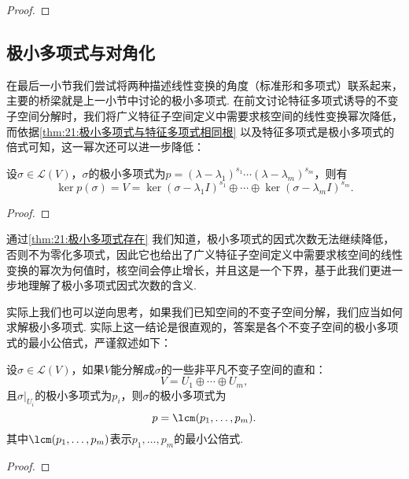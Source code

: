\begin{proof}

\end{proof}

\subsection{极小多项式与对角化}

在最后一小节我们尝试将两种描述线性变换的角度（标准形和多项式）联系起来，主要的桥梁就是上一小节中讨论的极小多项式. 在前文讨论特征多项式诱导的不变子空间分解时，我们将广义特征子空间定义中需要求核空间的线性变换幂次降低，而依据\autoref{thm:21:极小多项式与特征多项式相同根} 以及特征多项式是极小多项式的倍式可知，这一幂次还可以进一步降低：
\begin{theorem} \label{thm:21:极小多项式与分解}
    设$\sigma\in \mathcal{L}(V)$，$\sigma$的极小多项式为$p=(\lambda-\lambda_1)^{s_1}\cdots(\lambda-\lambda_m)^{s_m}$，则有
    \[\ker p(\sigma)=V=\ker (\sigma-\lambda_1I)^{s_1}\oplus\cdots\oplus\ker (\sigma-\lambda_mI)^{s_m}.\]
\end{theorem}

\begin{proof}

\end{proof}

通过\autoref{thm:21:极小多项式存在} 我们知道，极小多项式的因式次数无法继续降低，否则不为零化多项式，因此它也给出了广义特征子空间定义中需要求核空间的线性变换的幂次为何值时，核空间会停止增长，并且这是一个下界，基于此我们更进一步地理解了极小多项式因式次数的含义.

实际上我们也可以逆向思考，如果我们已知空间的不变子空间分解，我们应当如何求解极小多项式. 实际上这一结论是很直观的，答案是各个不变子空间的极小多项式的最小公倍式，严谨叙述如下：
\begin{theorem}
    设$\sigma\in\mathcal{L}(V)$，如果$V$能分解成$\sigma$的一些非平凡不变子空间的直和：
    \[V=U_1\oplus\cdots\oplus U_m,\]
    且$\sigma\vert_{U_i}$的极小多项式为$p_i$，则$\sigma$的极小多项式为
    \[p=\lcm(p_1,\ldots,p_m).\]
    其中$\lcm(p_1,\ldots,p_m)$表示$p_1,\ldots,p_m$的最小公倍式.
\end{theorem}

\begin{proof}

\end{proof}

